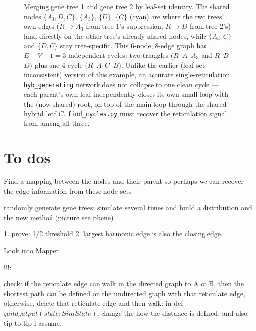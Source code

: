 \begin{figure}[h]
\centering
{}
\caption{Merging gene tree 1 and gene tree 2 by leaf-set identity. The shared nodes $\{A_3,D,C\}$, $\{A_3\}$, $\{D\}$, $\{C\}$ (cyan) are where the two trees' own edges ($R\!\to\!A_3$ from tree 1's suppression, $R\!\to\!D$ from tree 2's) land directly on the other tree's already-shared nodes, while $\{A_3,C\}$ and $\{D,C\}$ stay tree-specific. This 6-node, 8-edge graph has $E-V+1=3$ independent cycles: two triangles ($R$--$A$--$A_3$ and $R$--$B$--$D$) plus one 4-cycle ($R$--$A$--$C$--$B$). Unlike the earlier (leaf-set-inconsistent) version of this example, an accurate single-reticulation \texttt{hyb\_generating} network does not collapse to one clean cycle --- each parent's own leaf independently closes its own small loop with the (now-shared) root, on top of the main loop through the shared hybrid leaf $C$. \texttt{find\_cycles.py} must recover the reticulation signal from among all three.}
\end{figure}

\section{To dos}
Find a mapping between the nodes and their parent so perhaps we can recover the edge information from these node sets

randomly generate gene trees: simulate several times and build a distribution and the new method (picture see phone)

1. prove: 1/2 threshold
2. largest harmonic edge is also the closing edge. 

Look into Mapper

!!!:

check: if the reticulate edge can walk in the directed graph to A or B, then the shortest path can be defined on the undirected graph with that reticulate edge, otherwise, delete that reticulate edge and then walk:
in def $_build_output(state: SimState)$: change the how the distance is defined. and also tip to tip i assume. 




